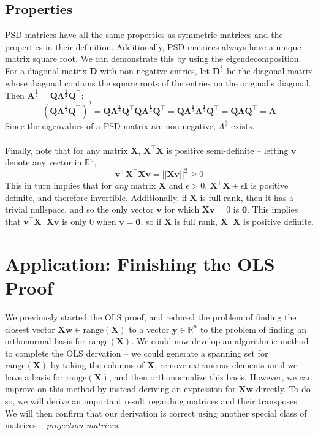 \documentclass{article}
\begin{document}
\subsection{Properties}
PSD matrices have all the same properties as symmetric matrices and the properties in their definition. Additionally, PSD matrices always have a unique matrix square root. We can demonstrate this by using the eigendecomposition. For a diagonal matrix $\mathbf{D}$ with non-negative entries, let $\mathbf{D}^{\frac{1}{2}}$ be the diagonal matrix whose diagonal contains the square roots of the entries on the original's diagonal. Then $\mathbf{A}^{\frac{1}{2}} = \mathbf{Q\Lambda^{\frac{1}{2}}Q^{\top}}$: $$(\mathbf{Q\Lambda^{\frac{1}{2}}Q^{\top}})^2 = \mathbf{Q\Lambda^{\frac{1}{2}}Q^{\top}Q\Lambda^{\frac{1}{2}}Q^{\top}} = \mathbf{Q\Lambda^{\frac{1}{2}}\Lambda^{\frac{1}{2}}Q^{\top}} = \mathbf{Q\Lambda Q^{\top}} = \mathbf{A}$$ Since the eigenvalues of a PSD matrix are non-negative, $\Lambda^{\frac{1}{2}}$ exists. \\\\
Finally, note that for any matrix $\mathbf{X}$, $\mathbf{X^{\top}X}$ is positive semi-definite -- letting $\mathbf{v}$ denote any vector in $\mathbb{R}^n$, $$\mathbf{v^{\top}X^{\top}Xv} = ||\mathbf{Xv}||^2 \geq 0$$
This in turn implies that for \textit{any} matrix $\mathbf{X}$ and $\epsilon > 0$, $\mathbf{X^{\top}X} + \epsilon\mathbf{I}$ is positive definite, and therefore invertible. Additionally, if $\mathbf{X}$ is full rank, then it has a trivial nullspace, and so the only vector $\mathbf{v}$ for which $\mathbf{Xv} = 0$ is $\mathbf{0}$. This implies that $\mathbf{v^{\top}X^{\top}Xv}$ is only 0 when $\mathbf{v} = \mathbf{0}$, so if $\mathbf{X}$ is full rank, $\mathbf{X^{\top}X}$ is positive definite.
\clearpage

\section{Application: Finishing the OLS Proof}
We previously started the OLS proof, and reduced the problem of finding the closest vector $\mathbf{Xw} \in \text{range}(\mathbf{X})$ to a vector $\mathbf{y} \in \mathbb{R}^n$ to the problem of finding an orthonormal basis for $\text{range}(\mathbf{X})$. We could now develop an algorithmic method to complete the OLS dervation -- we could generate a spanning set for $\text{range}(\mathbf{X})$ by taking the columns of $\mathbf{X}$, remove extraneous elements until we have a basis for $\text{range}(\mathbf{X})$, and then orthonormalize this basis. However, we can improve on this method by instead deriving an expression for $\mathbf{Xw}$ directly. To do so, we will derive an important result regarding matrices and their transposes. We will then confirm that our derivation is correct using another special class of matrices -- \textit{projection matrices}.
\end{document}
